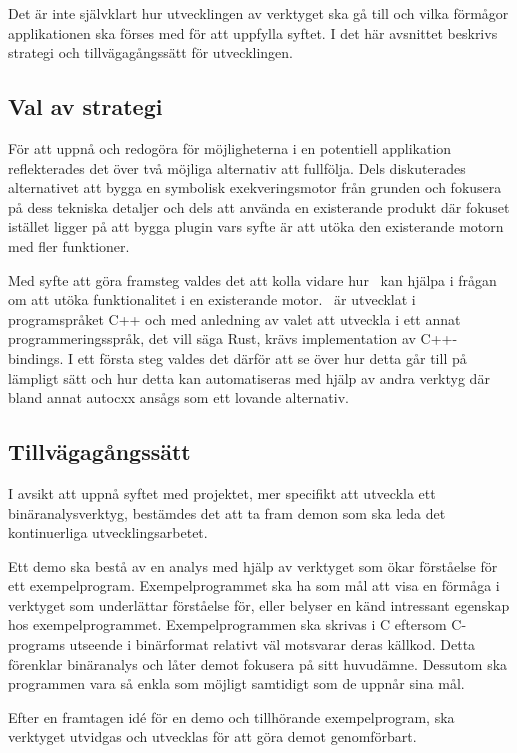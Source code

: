 Det är inte självklart hur utvecklingen av verktyget ska gå till och vilka
förmågor applikationen ska förses med för att uppfylla syftet. I det här
avsnittet beskrivs strategi och tillvägagångssätt för utvecklingen.

\subsection{Val av strategi}

För att uppnå och redogöra för möjligheterna i en potentiell applikation
reflekterades det över två möjliga alternativ att fullfölja. Dels diskuterades
alternativet att bygga en symbolisk exekveringsmotor från grunden och fokusera
på dess tekniska detaljer och dels att använda en existerande produkt där
fokuset istället ligger på att bygga plugin vars syfte är att utöka den
existerande motorn med fler funktioner.

Med syfte att göra framsteg valdes det att kolla vidare hur \stoe\ kan hjälpa i
frågan om att utöka funktionalitet i en existerande motor. \stoe\ är utvecklat
i programspråket C++ och med anledning av valet att utveckla i ett
annat programmeringsspråk, det vill säga Rust, krävs implementation av
C++-bindings. I ett första steg valdes det därför att se över hur detta går till
på lämpligt sätt och hur detta kan automatiseras med hjälp av andra verktyg
där bland annat autocxx ansågs som ett lovande alternativ.

\subsection{Tillvägagångssätt}
I avsikt att uppnå syftet med projektet, mer specifikt att utveckla ett
binäranalysverktyg, bestämdes det att ta fram demon som ska leda det
kontinuerliga utvecklingsarbetet.

Ett demo ska bestå av en analys med hjälp av verktyget som ökar förståelse för
ett exempelprogram. Exempelprogrammet ska ha som mål att visa en förmåga i
verktyget som underlättar förståelse för, eller belyser en känd intressant
egenskap hos exempelprogrammet. Exempelprogrammen ska skrivas i C eftersom
C-programs utseende i binärformat relativt väl motsvarar deras källkod. Detta
förenklar binäranalys och låter demot fokusera på sitt huvudämne. Dessutom ska
programmen vara så enkla som möjligt samtidigt som de uppnår sina mål.

Efter en framtagen id\'e för en demo och tillhörande exempelprogram, ska
verktyget utvidgas och utvecklas för att göra demot genomförbart.

